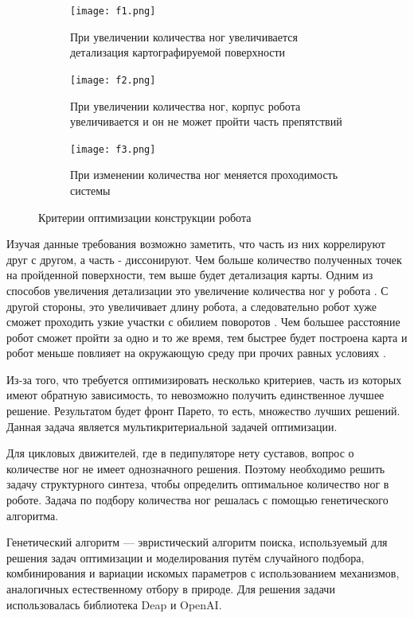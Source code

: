 \begin{figure}[H]
    \begin{subfigure}{0.9\textwidth}
        \centering\texttt{[image: f1.png]}
        \caption{При увеличении количества ног увеличивается детализация картографируемой поверхности}
        \label{fig:f1.png}
    \end{subfigure}

    \begin{subfigure}{0.9\textwidth}
        \centering\texttt{[image: f2.png]}
        \caption{При увеличении количества ног, корпус робота увеличивается и он не может пройти часть препятствий}
        \label{fig:f2.png}
    \end{subfigure}

    \begin{subfigure}{0.9\textwidth}
        \centering\texttt{[image: f3.png]}
        \caption{При изменении количества ног меняется проходимость системы}
        \label{fig:f3.png}
    \end{subfigure}

\caption{Критерии оптимизации конструкции робота}
\label{fig:opti_criteria}
\end{figure}
Изучая данные требования возможно заметить, что часть из них коррелируют друг с другом, а часть - диссонируют. Чем больше количество полученных точек на пройденной поверхности, тем выше будет детализация карты. Одним из способов увеличения детализации это увеличение количества ног у робота . С другой стороны, это увеличивает длину робота, а следовательно робот хуже сможет проходить узкие участки с обилием поворотов . Чем большее расстояние робот сможет пройти за одно и то же время, тем быстрее будет построена карта и робот меньше повлияет на окружающую среду при прочих равных условиях . 

Из-за того, что требуется оптимизировать несколько критериев, часть из которых имеют обратную зависимость, то невозможно получить единственное лучшее решение. Результатом будет фронт Парето, то есть, множество лучших решений. Данная задача является мультикритериальной задачей оптимизации.

Для цикловых движителей, где в педипуляторе нету суставов, вопрос о количестве ног не имеет однозначного решения. Поэтому необходимо решить задачу структурного синтеза, чтобы определить оптимальное количество ног в роботе. Задача по подбору количества ног решалась с помощью генетического алгоритма.

Генетический алгоритм --- эвристический алгоритм поиска, используемый для решения задач оптимизации и моделирования путём случайного подбора, комбинирования и вариации искомых параметров с использованием механизмов, аналогичных естественному отбору в природе. Для решения задачи использовалась библиотека Deap и OpenAI.

